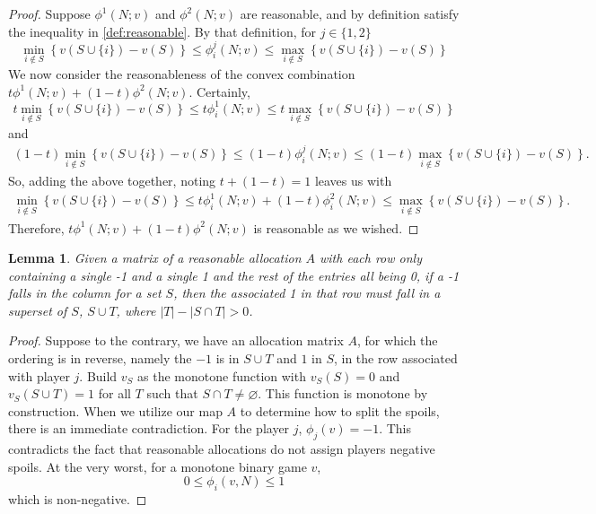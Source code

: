 \documentclass[12pt,letterpaper,final]{article}
\theoremstyle{plain}
\theoremstyle{plain}
\theoremstyle{plain}
\newtheorem{lemma}[theorem]{Lemma}
\theoremstyle{plain}
\theoremstyle{plain}
\theoremstyle{plain}
\theoremstyle{plain}
\theoremstyle{definition}
\theoremstyle{definition}
\theoremstyle{definition}
\theoremstyle{definition}
\theoremstyle{definition}
\theoremstyle{remark}
\theoremstyle{remark}
\theoremstyle{remark}
\theoremstyle{remark}
\begin{document}
\begin{proof}
  Suppose \(\phi^1(N;v)\) and \(\phi^2(N;v)\) are reasonable, and by definition
  satisfy the inequality in \cref{def:reasonable}. 
  By that definition, for \(j\in \{1,2\}\)
  \[
    \min_{i\notin S}\left\{ v\left(S \cup\{i\}\right) - v(S)\right\}
    \leq \phi_i^j(N;v) \leq\max_{i\notin S}\left\{v\left(S
        \cup\{i\}\right) - v(S)\right\}
  \]
  We now consider the reasonableness of the convex combination \(t
  \phi^1(N;v)  +(1-t)\phi^2(N;v)\).
  Certainly,
  \[
    t\min_{i\notin S}\left\{ v\left(S \cup\{i\}\right) - v(S)\right\}
    \leq t\phi_i^1(N;v) \leq t\max_{i\notin S}\left\{ v\left(S
        \cup\{i\}\right) - v(S)\right\}
  \]
  and
  \begin{multline*}
    (1-t)\min_{i\notin S}\left\{ v\left(S \cup\{i\}\right) -
      v(S)\right\} 
    \leq (1-t)\phi_i^j(N;v) \leq
    (1-t)\max_{i\notin
      S}\left\{ v\left(S \cup\{i\}\right) - v(S)\right\}.
  \end{multline*}
  So, adding the above together, noting \(t + (1-t) = 1\) leaves us
  with
  \begin{multline*}
    \min_{i\notin S}\left\{ v\left(S \cup\{i\}\right) - v(S)\right\}
    \leq t\phi_i^1(N;v) + (1-t)\phi_i^2(N;v)\leq 
    \max_{i\notin S}\left\{
      v\left(S \cup \{i\}\right) - v(S)\right\}.
  \end{multline*}
  Therefore, \(t \phi^1(N;v)  +(1-t)\phi^2(N;v)\) is reasonable as we wished. 
\end{proof}

\begin{lemma}\label{lem:order1s}
  Given a matrix of a reasonable allocation \(A\) with each row
  only containing a single -1 and a single
  1 and the rest of the entries all being 0, if a -1 falls in the
  column for a set \(S\), then the associated 1 in that row must fall
  in a superset of \(S\), \(S \cup T\), where \(|T|-|S\cap T| > 0\).
\end{lemma}

\begin{proof}
  Suppose to the contrary, we have an allocation matrix \(A\), for
  which the 
  ordering is in reverse, namely the \(-1\) is in \(S\cup T\) and
  \(1\) in \(S\), in the row associated with player \(j\).
  Build \(v_S\) as the monotone function
  with \(v_S(S) = 0\) and \(v_S(S \cup T) = 1\) for all \(T\) such
  that  \(S \cap T \neq \varnothing\). This function is
  monotone by construction. When we utilize our map \(A\) to
  determine how to split the spoils, there is an immediate
  contradiction. For the player \(j\), \(\phi_j(v) = -1\). This
  contradicts the fact that reasonable allocations do not assign 
  players 
  negative spoils. At the very worst, for a monotone binary game \(v\),
  \[
    0\leq \phi_i(v,N)\leq 1 
  \]
  which is non-negative.
\end{proof}
\end{document}
